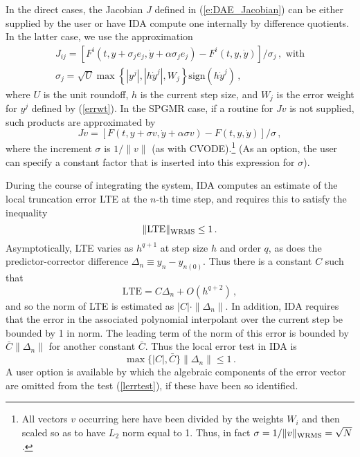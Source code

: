 In the direct cases, the Jacobian $J$ defined in (\ref{e:DAE_Jacobian}) 
can be either supplied by the user or have IDA compute one internally 
by difference quotients. In the latter case, we use the approximation
\begin{gather*}
  J_{ij} = [F^i(t,y+\sigma_j e_j,{\dot y}+\alpha\sigma_j e_j) - 
            F^i(t,y,{\dot y})]/\sigma_j \, , \text{ with}\\
  \sigma_j = \sqrt{U} \max \left\{ |y^j|, |h{\dot y}^j|,W_j \right\}
             \mbox{sign}(h {\dot y}^j) \, ,
\end{gather*}
where $U$ is the unit roundoff, $h$ is the current step size, and $W_j$ is 
the error weight for $y^j$ defined by (\ref{errwt}).
In the SPGMR case, if a routine for $Jv$ is not supplied, such products are
approximated by
\begin{equation*}
Jv = [F(t,y+\sigma v,{\dot y}+\alpha\sigma v) - F(t,y,{\dot y})]/\sigma \, ,
\end{equation*}
where the increment $\sigma$ is $1/\|v\|$ (as with
CVODE).\footnote{All vectors $v$ occurring here have been divided by
the weights $W_i$ and then scaled so as to have $L_2$ norm equal to 1.
Thus, in fact $\sigma = 1/\|v\|_{\mbox{\scriptsize WRMS}}=\sqrt{N}$.}
(As an option, the user can specify a constant factor that is inserted
into this expression for $\sigma$).

During the course of integrating the system, IDA computes an estimate
of the local truncation error LTE at the $n$-th time step, and
requires this to satisfy the inequality
\begin{equation*}
  \| \mbox{LTE} \|_{\mbox{\scriptsize WRMS}} \leq 1 \, .               
\end{equation*}
Asymptotically, LTE varies as $h^{q+1}$ at step size $h$ and order $q$, as
does the predictor-corrector difference $\Delta_n \equiv y_n-y_{n(0)}$.  
Thus there is a constant $C$ such that
\[ \mbox{LTE} = C \Delta_n + O(h^{q+2}) \, , \]
and so the norm of LTE is estimated as $|C| \cdot \|\Delta_n\|$.
In addition, IDA requires that the error in the associated polynomial
interpolant over the current step be bounded by 1 in norm.  The
leading term of the norm of this error is bounded by
$\bar{C} \|\Delta_n\|$ for another constant $\bar{C}$.  Thus the local
error test in IDA is
\begin{equation}\label{lerrtest}
   \max\{ |C|, \bar{C} \} \|\Delta_n\| \leq 1 \, .
\end{equation}
A user option is available by which the algebraic components of the
error vector are omitted from the test (\ref{lerrtest}), if these have
been so identified.

